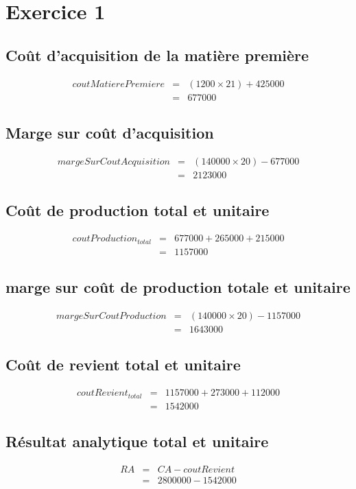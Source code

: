 \documentclass{article}
\begin{document}
	\maketitle
	\section{Exercice 1}
	\subsection{Coût d'acquisition de la matière première}
	\begin{eqnarray*}
		coutMatierePremiere &=& (1200 \times 21) + 425000 \\
		&=& 677000
	\end{eqnarray*}
	\subsection{Marge sur coût d'acquisition}
	\begin{eqnarray*}
		margeSurCoutAcquisition &=& (140000 \times 20) - 677000 \\ &=& 2123000
	\end{eqnarray*}
	\subsection{Coût de production total et unitaire}
	\begin{eqnarray*}
		coutProduction_{total} &=& 677000 + 265000 + 215000\\
		&=& 1157000
	\end{eqnarray*}
	\subsection{marge sur coût de production totale et unitaire}
		\begin{eqnarray*}
			margeSurCoutProduction &=& (140000 \times 20) - 1157000\\
			&=& 1643000
		\end{eqnarray*}
	\subsection{Coût de revient total et unitaire}
		\begin{eqnarray*}
			coutRevient_{total} &=& 1157000 + 273000 + 112000\\
			&=& 1542000 
		\end{eqnarray*}
		\subsection{Résultat analytique total et unitaire}
		\begin{eqnarray*}
			RA &=& CA - coutRevient \\ &=& 2800000 - 1542000
		\end{eqnarray*}
\end{document}

